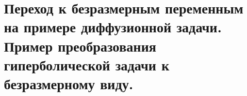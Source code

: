 \section{Переход к безразмерным переменным на примере диффузионной задачи.
Пример преобразования гиперболической задачи к безразмерному виду.}

\newpage

